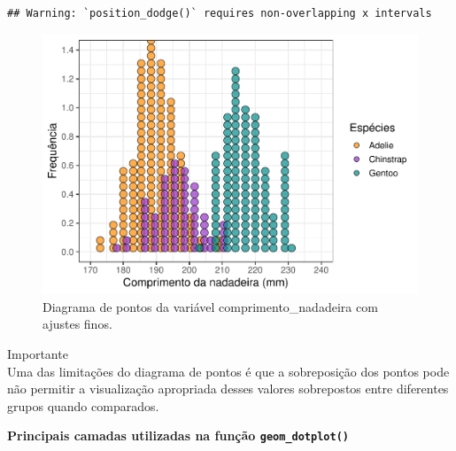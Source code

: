 \documentclass[
]{article}
\begin{document}
\begin{verbatim}
## Warning: `position_dodge()` requires non-overlapping x intervals
\end{verbatim}

\begin{figure}
\includegraphics[width=0.75\linewidth,height=0.75\textheight]{epr_files/figure-latex/fig-dot-flipper-fino-1} \caption{Diagrama de pontos da variável comprimento_nadadeira com ajustes finos.}\label{fig:fig-dot-flipper-fino}
\end{figure}

Importante \\
Uma das limitações do diagrama de pontos é que a sobreposição dos pontos pode não permitir a visualização apropriada desses valores sobrepostos entre diferentes grupos quando comparados.

\textbf{Principais camadas utilizadas na função \texttt{geom\_dotplot()}}
\end{document}

